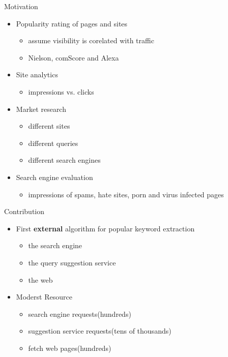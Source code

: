\documentclass{beamer}
\begin{document}
    \begin{frame}{Motivation}
        \begin{itemize}
        \item  Popularity rating of pages and sites
            \begin{itemize}
            \item assume visibility is corelated with traffic
            \item Nielson, comScore and Alexa
            \end{itemize}
        \item  Site analytics
            \begin{itemize}
            \item impressions vs. clicks
            \end{itemize}
        \item  Market research
            \begin{itemize}
            \item different sites
            \item different queries
            \item different search engines
            \end{itemize}
        \item  Search engine evaluation
            \begin{itemize}
            \item impressions of spams, hate sites, porn and virus infected pages
            \end{itemize}
        \end{itemize}
    \end{frame}

    \begin{frame}{Contribution}
        \begin{itemize}
        \item First \textbf{external} algorithm for popular keyword extraction
            \begin{itemize}
            \item the search engine
            \item the query suggestion service
            \item the web
            \end{itemize}
        \item Moderst Resource
            \begin{itemize}
            \item search engine requests(hundreds)
            \item suggestion service requests(tens of thousands)
            \item fetch web pages(hundreds)
            \end{itemize}
        \end{itemize}
    \end{frame}
\end{document}
